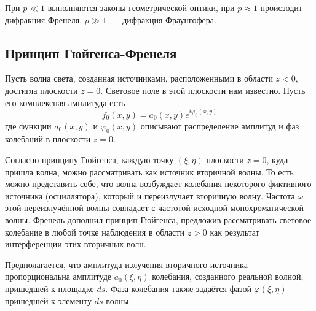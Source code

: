 При $p \ll 1$ выполняются законы геометрической оптики, при $p\approx 1$ происзодит дифракция Френеля, $p\gg 1$~--- дифракция Фраунгофера.

\subsection{Принцип Гюйгенса-Френеля}
\begin{figure}[ht!]
\end{figure}

Пусть волна света, созданная источниками, расположенными в области $z < 0$, достигла плоскости $z=0$. Световое поле в этой плоскости нам известно. Пусть его комплексная амплитуда есть
\[
    f_{0}(x, y) = a_{0}(x, y)e^{i \varphi_{0}(x, y)}
\]
где функции $a_{0}(x, y)$ и $ \varphi_{0}(x, y)$ описывают распределение амплитуд и фаз колебаний в плоскости $z=0$.

Согласно принципу Гюйгенса, каждую точку $( \xi, \eta)$ плоскости $z = 0$, куда пришла волна, можно рассматривать  как источник вторичной волны. То есть можно представить себе, что волна возбуждает колебания некоторого фиктивного источника (осциллятора), который и переизлучает вторичную волну. Частота $ \omega$ этой переизлучённой волны совпадает с частотой исходной монохроматической волны. Френель дополнил принцип Гюйгенса, предложив рассматривать световое колебание в любой точке наблюдения в области $z > 0$ как результат интерференции этих вторичных волн.

Предполагается, что амплитуда излучения вторичного источника пропорциональна амплитуде $a_{0}(\xi, \eta)$  колебания, созданного реальной волной, пришедшей к площадке $ds$. Фаза колебания также задаётся фазой $ \varphi( \xi, \eta)$ пришедшей к элементу $ds$ волны.


